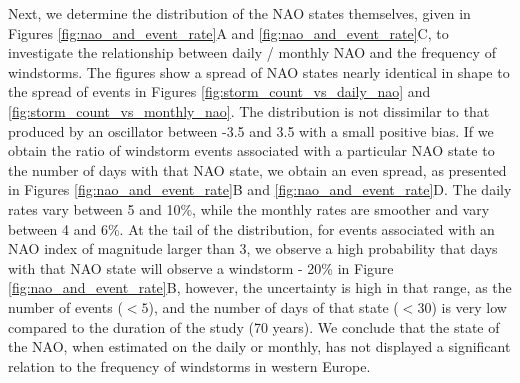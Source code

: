         Next, we determine the distribution of the NAO states themselves, given in Figures \ref{fig:nao_and_event_rate}A and \ref{fig:nao_and_event_rate}C, to investigate the relationship between daily / monthly NAO and the frequency of windstorms. The figures show a spread of NAO states nearly identical in shape to the spread of events in Figures \ref{fig:storm_count_vs_daily_nao} and \ref{fig:storm_count_vs_monthly_nao}. The distribution is not dissimilar to that produced by an oscillator between -3.5 and 3.5 with a small positive bias. If we obtain the ratio of windstorm events associated with a particular NAO state to the number of days with that NAO state, we obtain an even spread, as presented in Figures \ref{fig:nao_and_event_rate}B and \ref{fig:nao_and_event_rate}D. The daily rates vary between 5 and 10\%, while the monthly rates are smoother and vary between 4 and 6\%. At the tail of the distribution, for events associated with an NAO index of magnitude larger than 3, we observe a high probability that days with that NAO state will observe a windstorm - 20\% in Figure \ref{fig:nao_and_event_rate}B, however, the uncertainty is high in that range, as the number of events ($<5$), and the number of days of that state ($<30$) is very low compared to the duration of the study (70 years). We conclude that the state of the NAO, when estimated on the daily or monthly, has not displayed a significant relation to the frequency of windstorms in western Europe.

